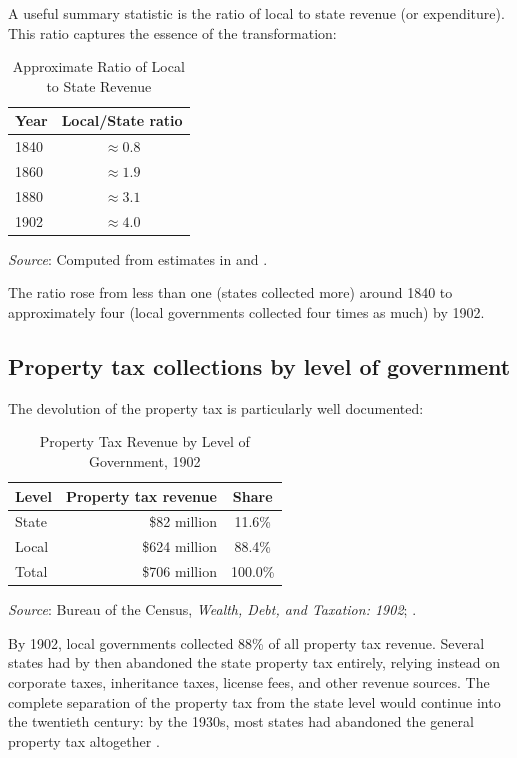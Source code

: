 \documentclass[12pt]{article}
\begin{document}
A useful summary statistic is the ratio of local to state revenue (or expenditure).  This ratio captures the essence of the transformation:

\begin{table}[htbp]
\centering
\caption{Approximate Ratio of Local to State Revenue}
\label{tab:ratio}
\begin{tabular}{@{}lc@{}}
\toprule
Year & Local/State ratio \\
\midrule
1840 & $\approx 0.8$ \\
1860 & $\approx 1.9$ \\
1880 & $\approx 3.1$ \\
1902 & $\approx 4.0$ \\
\bottomrule
\end{tabular}
\smallskip

\small\textit{Source}: Computed from estimates in \citet{wallis2000jep} and \citet{wallis2006hsus}.
\end{table}

\noindent The ratio rose from less than one (states collected more) around 1840 to approximately four (local governments collected four times as much) by 1902.

\subsection{Property tax collections by level of government}

The devolution of the property tax is particularly well documented:

\begin{table}[htbp]
\centering
\caption{Property Tax Revenue by Level of Government, 1902}
\label{tab:proptax}
\begin{tabular}{@{}lrc@{}}
\toprule
Level & Property tax revenue & Share \\
\midrule
State & \$82 million & 11.6\% \\
Local & \$624 million & 88.4\% \\
\midrule
Total & \$706 million & 100.0\% \\
\bottomrule
\end{tabular}
\smallskip

\small\textit{Source}: Bureau of the Census, \textit{Wealth, Debt, and Taxation: 1902}; \citet{wallis2001property}.
\end{table}

\noindent By 1902, local governments collected  88\% of all property tax revenue.  Several states had by then abandoned the state property tax entirely, relying instead on corporate taxes, inheritance taxes, license fees, and other revenue sources.  The complete separation of the property tax from the state level would continue into the twentieth century: by the 1930s, most states had abandoned the general property tax altogether \citep{wallis2001property}.
\end{document}
